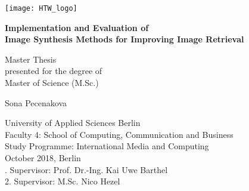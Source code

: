 \begin{titlepage}
    \begin{center}
		\texttt{[image: HTW\_logo]}    
		\vspace{1cm}
        
        \Large
        \textbf{Implementation and Evaluation of \\ Image Synthesis Methods for Improving Image Retrieval}
        
        \vspace{0.5cm}
        \Large
        Master Thesis\\
        \vspace{0.5cm}
        \normalsize
        presented for the degree of\\
        Master of Science (M.Sc.)
        
        \vspace{1.5cm}
        
        \Large
        Sona Pecenakova
        
        \end{center}
      
\vspace{1.5cm}

\vfill
\normalsize
\noindent
University of Applied Sciences Berlin\\
Faculty 4: School of Computing, Communication and Business\\
Study Programme: International Media and Computing\\
	
 October 2018, Berlin\\
      
. Supervisor: Prof. Dr.-Ing. Kai Uwe Barthel\\
2. Supervisor: M.Sc. Nico Hezel\\
\end{titlepage}